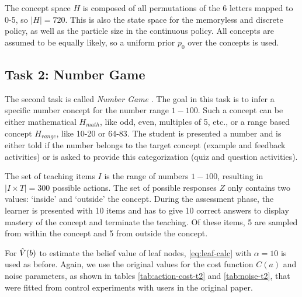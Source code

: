 The concept space $H$ is composed of all permutations of the 6 letters mapped to 0-5, so $|H|= 720$. 
This is also the state space for the memoryless and discrete policy, as well as the particle size in the continuous policy.
All concepts are assumed to be equally likely, so a uniform prior $p_0$ over the concepts is used.


\subsection{Task 2: Number Game}

The second task is called \textit{Number Game} \cite{tenenbaum2000rules}. 
The goal in this task is to infer a specific number concept for the number range $1-100$. Such a concept can be either mathematical $H_{math}$, like odd, even, multiples of 5, etc., or a range based concept $H_{range}$, like 10-20 or 64-83.
The student is presented a number and is either told if the number belongs to the target concept (example and feedback activities) or is asked to provide this categorization (quiz and question activities).

The set of teaching items $I$ is the range of numbers $1-100$, resulting in $|I \times T|=300$ possible actions.
The set of possible responses $Z$ only contains two values: `inside' and `outside' the concept.
During the assessment phase, the learner is presented with 10 items and has to give 10 correct answers to display mastery of the concept and terminate the teaching.
Of these items, 5 are sampled from within the concept and 5 from outside the concept.

For $\Hat{V}(b)$ to estimate the belief value of leaf nodes, \autoref{eq:leaf-calc} with $\alpha = 10$ is used as before.
Again, we use the original values for the cost function $C(a)$ and noise parameters, as shown in tables \ref{tab:action-cost-t2} and \ref{tab:noise-t2}, that were fitted from control experiments with users in the original paper.


